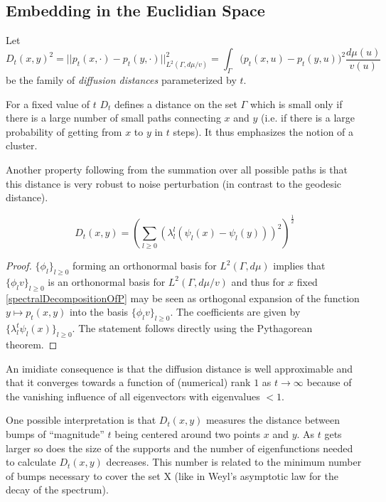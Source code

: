 \subsection{Embedding in the Euclidian Space}
\begin{definition}
Let $$D_t(x,y)^2 =
||p_t(x, \cdotp) - p_t(y, \cdotp)||_{L^2(\Gamma, d\mu/v)}^2 =
\int_\Gamma \big(p_t(x, u) - p_t(y, u)\big)^2 \frac{d\mu(u)}{v(u)}$$
be the family of \textit{diffusion distances} parameterized by $t$.
\end{definition}

For a fixed value of $t$ $D_t$ defines a distance on the set $\Gamma$ which is small only if there is a large number of small paths connecting $x$ and $y$ (i.e. if there is a large probability of getting from $x$ to $y$ in $t$ steps). It thus emphasizes the notion of a cluster.

Another property following from the summation over all possible paths is that this distance is very robust to noise perturbation (in contrast to the geodesic distance).

\begin{theorem}
$$D_t(x,y)=\left(\sum_{l\geq 0} \left(\lambda_l^{l}(\psi_l(x) - \psi_l(y))\right)^2 \right)^{\frac{1}{2}}$$
\end{theorem}

\begin{proof}
$\{\phi_l\}_{l\geq 0}$ forming an orthonormal basis for $L^2(\Gamma, d\mu)$ implies that $\{\phi_l v\}_{l\geq 0}$ is an orthonormal basis for $L^2(\Gamma, d\mu/v)$ and thus for $x$ fixed \eqref{spectralDecompositionOfP} may be seen as orthogonal expansion of the function $y \mapsto p_t(x,y)$ into the basis $\{\phi_l v\}_{l\geq 0}$.
The coefficients are given by $\{\lambda_l^t \psi_l(x)\}_{l\geq 0}$. The statement follows directly using the Pythagorean theorem.
\end{proof}

An imidiate consequence is that the diffusion distance is well approximable and that it converges towards a function of (numerical) rank $1$ as $t\rightarrow\infty$ because of the vanishing influence of all eigenvectors with eigenvalues $<1$.

One possible interpretation is that $D_t(x,y)$ measures the distance between bumps of ``magnitude'' $t$ being centered around two points $x$ and $y$. As $t$ gets larger so does the size of the supports and the number of eigenfunctions needed to calculate $D_t(x,y)$ decreases. This number is related to the minimum number of bumps necessary to cover the set X (like in Weyl’s asymptotic law for the decay of the spectrum).

